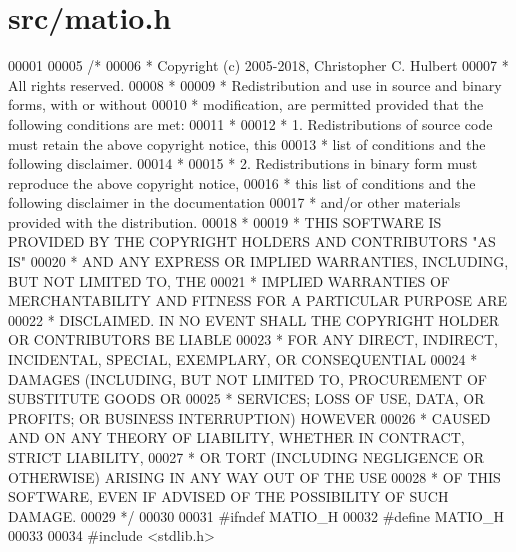 \hypertarget{src_2matio_8h_source}{}\section{src/matio.h}
\label{src_2matio_8h_source}

\begin{DoxyCode}
00001 
00005 \textcolor{comment}{/*}
00006 \textcolor{comment}{ * Copyright (c) 2005-2018, Christopher C. Hulbert}
00007 \textcolor{comment}{ * All rights reserved.}
00008 \textcolor{comment}{ *}
00009 \textcolor{comment}{ * Redistribution and use in source and binary forms, with or without}
00010 \textcolor{comment}{ * modification, are permitted provided that the following conditions are met:}
00011 \textcolor{comment}{ *}
00012 \textcolor{comment}{ * 1. Redistributions of source code must retain the above copyright notice, this}
00013 \textcolor{comment}{ *    list of conditions and the following disclaimer.}
00014 \textcolor{comment}{ *}
00015 \textcolor{comment}{ * 2. Redistributions in binary form must reproduce the above copyright notice,}
00016 \textcolor{comment}{ *    this list of conditions and the following disclaimer in the documentation}
00017 \textcolor{comment}{ *    and/or other materials provided with the distribution.}
00018 \textcolor{comment}{ *}
00019 \textcolor{comment}{ * THIS SOFTWARE IS PROVIDED BY THE COPYRIGHT HOLDERS AND CONTRIBUTORS "AS IS"}
00020 \textcolor{comment}{ * AND ANY EXPRESS OR IMPLIED WARRANTIES, INCLUDING, BUT NOT LIMITED TO, THE}
00021 \textcolor{comment}{ * IMPLIED WARRANTIES OF MERCHANTABILITY AND FITNESS FOR A PARTICULAR PURPOSE ARE}
00022 \textcolor{comment}{ * DISCLAIMED. IN NO EVENT SHALL THE COPYRIGHT HOLDER OR CONTRIBUTORS BE LIABLE}
00023 \textcolor{comment}{ * FOR ANY DIRECT, INDIRECT, INCIDENTAL, SPECIAL, EXEMPLARY, OR CONSEQUENTIAL}
00024 \textcolor{comment}{ * DAMAGES (INCLUDING, BUT NOT LIMITED TO, PROCUREMENT OF SUBSTITUTE GOODS OR}
00025 \textcolor{comment}{ * SERVICES; LOSS OF USE, DATA, OR PROFITS; OR BUSINESS INTERRUPTION) HOWEVER}
00026 \textcolor{comment}{ * CAUSED AND ON ANY THEORY OF LIABILITY, WHETHER IN CONTRACT, STRICT LIABILITY,}
00027 \textcolor{comment}{ * OR TORT (INCLUDING NEGLIGENCE OR OTHERWISE) ARISING IN ANY WAY OUT OF THE USE}
00028 \textcolor{comment}{ * OF THIS SOFTWARE, EVEN IF ADVISED OF THE POSSIBILITY OF SUCH DAMAGE.}
00029 \textcolor{comment}{ */}
00030 
00031 \textcolor{preprocessor}{#ifndef MATIO\_H}
00032 \textcolor{preprocessor}{#define MATIO\_H}
00033 
00034 \textcolor{preprocessor}{#include <stdlib.h>}

\end{DoxyCode}
